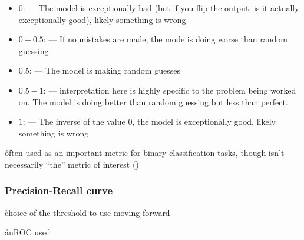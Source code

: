 \begin{itemize}[noitemsep,topsep=0pt]
	\item $0$: --- The model is exceptionally bad (but if you flip the output, is it actually exceptionally good), likely something is wrong
	\item $0 - 0.5$: --- If no mistakes are made, the mode is doing worse than random guessing
	\item $0.5$: --- The model is making random guesses
	\item $0.5 - 1$: --- interpretation here is highly specific to the problem being worked on. The model is doing better than random guessing but less than perfect.
	\item $1$: --- The inverse of the value $0$, the model is exceptionally good, likely something is wrong
\end{itemize}

\r{often used as an important metric for binary classification tasks, though isn't necessarily ``the'' metric of interest ()}


\subsubsection{Precision-Recall curve}


\r{choice of the threshold to use moving forward}

\r{auROC \ALR used}